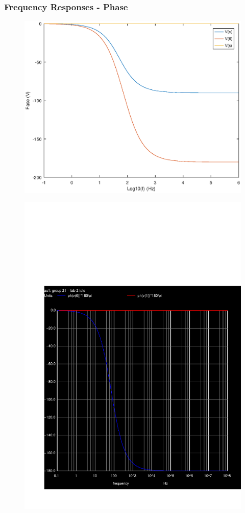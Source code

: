\subsubsection{Frequency Responses - Phase}

\begin{figure}
\centering
\begin{minipage}{.5\textwidth}
  \centering
  \includegraphics[width=.4\linewidth]{phase.eps}
  \label{fig:test1}
\end{minipage}%
\begin{minipage}{.5\textwidth}
  \centering
  \includegraphics[width=.4\linewidth]{question5_ph.pdf}
  \label{fig:test2}
\end{minipage}
\end{figure}
